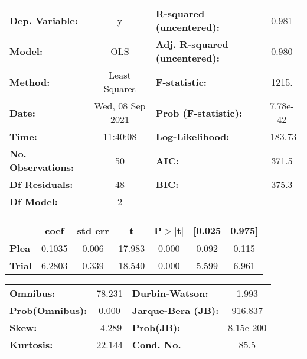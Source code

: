 \begin{center}
\begin{tabular}{lclc}
\toprule
\textbf{Dep. Variable:}    &        y         & \textbf{  R-squared (uncentered):}      &     0.981   \\
\textbf{Model:}            &       OLS        & \textbf{  Adj. R-squared (uncentered):} &     0.980   \\
\textbf{Method:}           &  Least Squares   & \textbf{  F-statistic:       }          &     1215.   \\
\textbf{Date:}             & Wed, 08 Sep 2021 & \textbf{  Prob (F-statistic):}          &  7.78e-42   \\
\textbf{Time:}             &     11:40:08     & \textbf{  Log-Likelihood:    }          &   -183.73   \\
\textbf{No. Observations:} &          50      & \textbf{  AIC:               }          &     371.5   \\
\textbf{Df Residuals:}     &          48      & \textbf{  BIC:               }          &     375.3   \\
\textbf{Df Model:}         &           2      & \textbf{                     }          &             \\
\bottomrule
\end{tabular}
\begin{tabular}{lcccccc}
               & \textbf{coef} & \textbf{std err} & \textbf{t} & \textbf{P$> |$t$|$} & \textbf{[0.025} & \textbf{0.975]}  \\
\midrule
\textbf{Plea}  &       0.1035  &        0.006     &    17.983  &         0.000        &        0.092    &        0.115     \\
\textbf{Trial} &       6.2803  &        0.339     &    18.540  &         0.000        &        5.599    &        6.961     \\
\bottomrule
\end{tabular}
\begin{tabular}{lclc}
\textbf{Omnibus:}       & 78.231 & \textbf{  Durbin-Watson:     } &     1.993  \\
\textbf{Prob(Omnibus):} &  0.000 & \textbf{  Jarque-Bera (JB):  } &   916.837  \\
\textbf{Skew:}          & -4.289 & \textbf{  Prob(JB):          } & 8.15e-200  \\
\textbf{Kurtosis:}      & 22.144 & \textbf{  Cond. No.          } &      85.5  \\
\bottomrule
\end{tabular}
\end{center}
